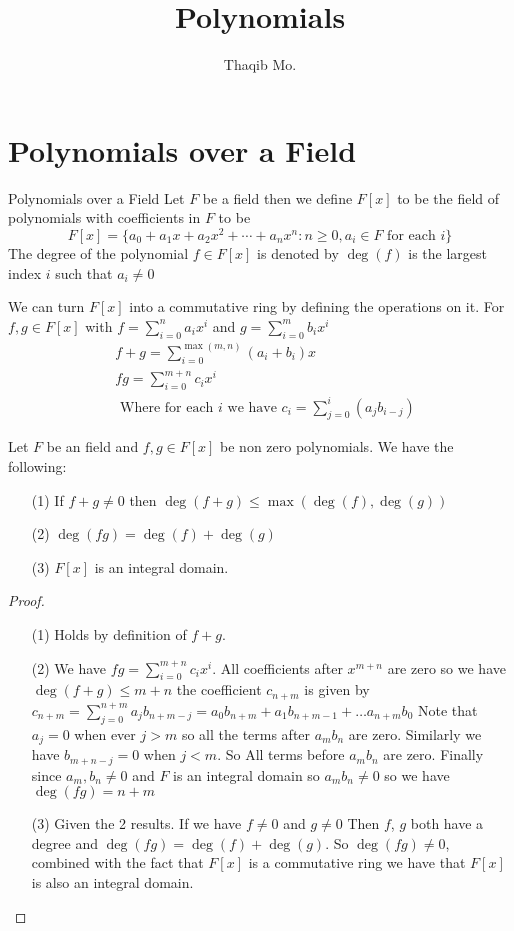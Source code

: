 \documentclass[16pt,a4paper]{article}
\author{Thaqib Mo.}
\title{ Polynomials }
\theoremstyle{definition}
\begin{document}
\maketitle
\newpage
\section{Polynomials over a Field}


\begin{defn}{Polynomials over a Field}{}
Let $F$ be a field then we define $F[x]$ to be the field of polynomials with coefficients in $F$ to be 
\[F[x] = \{a_0 + a_1x+a_2x^2 + \cdots + a_nx^n : n\geq 0, a_i \in F \text{ for each $i$}\}\]
The degree of the polynomial $f\in F[x]$ is denoted by $\deg(f)$ is the largest index $i$ such that $a_i \neq 0$
\end{defn}
We can turn $F[x]$ into a commutative ring by defining the operations on it. For $f,g\in F[x]$ with $f =\sum\limits_{i=0}^n a_ix^i$ and $g =\sum\limits_{i=0}^m b_ix^i$  
\begin{align*}
&f+g = \sum_{i=0}^{\max(m,n)}(a_i + b_i)x \\
&fg = \sum_{i=0}^{m+n}c_ix^i \\
&\text{ Where for each $i$ we have $c_i =$}\sum_{j=0}^i (a_jb_{i-j}) 
\end{align*}




\begin{thm}{}{}
Let $F$ be an field and $f,g \in F[x]$ be non zero polynomials. We have the following:
\begin{itemize}
\item[(1)] If $f+g\neq 0$ then $\deg(f+g) \leq \max(\deg(f),\deg(g))$
\item[(2)] $\deg(fg) = \deg(f)+\deg(g)$
\item[(3)] $F[x]$ is an integral domain.
\end{itemize}
\end{thm}
\begin{proof}
\begin{itemize}
\item[(1)] Holds by definition of $f+g$. 

\item[(2)] We have $fg =\sum_{i=0}^{m+n}c_ix^i$. All coefficients after $x^{m+n}$ are zero so we have $\deg(f+g)\leq m+n$ the coefficient $c_{n+m}$ is given by $
c_{n+m} = \sum_{j=0}^{n+m} a_jb_{n+m-j} = a_0b_{n+m} + a_1b_{n+m-1}+\ldots a_{n+m}b_0
$
Note that $a_j = 0$ when ever $j>m$ so all the terms after $a_{m}b_{n}$ are zero. Similarly we have $b_{m+n-j} = 0$ when $j<m$. So All terms before $a_mb_{n}$ are zero. Finally since $a_m,b_n \neq 0$ and $F$ is an integral domain so $a_mb_{n}\neq 0$ so we have  $\deg(fg) = n+m$  

\item[(3)] Given the 2 results. If we have $f\neq 0$ and $g\neq 0$ Then $f$, $g$ both have a degree and $\deg(fg) = \deg(f)+\deg(g)$. So $\deg(fg)\neq 0$, combined with the fact that $F[x]$ is a commutative ring we have that $F[x]$ is also an integral domain. 
\end{itemize}
\end{proof}
\newpage
\end{document}
